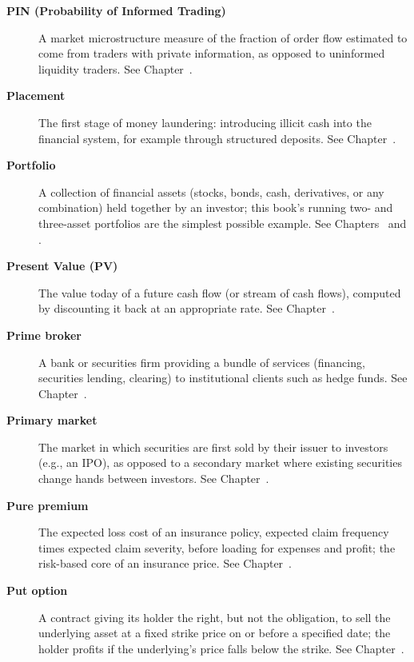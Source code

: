 \documentclass[../ai_in_finance]{subfiles}
\begin{document}
\begin{description}
\item[\textbf{PIN (Probability of Informed Trading)}] A market microstructure measure of the fraction of order flow estimated to come from traders with private information, as opposed to uninformed liquidity traders. See Chapter~.

\item[\textbf{Placement}] The first stage of money laundering: introducing illicit cash into the financial system, for example through structured deposits. See Chapter~.

\item[\textbf{Portfolio}] A collection of financial assets (stocks, bonds, cash, derivatives, or any combination) held together by an investor; this book's running two- and three-asset portfolios are the simplest possible example. See Chapters~ and .

\item[\textbf{Present Value (PV)}] The value today of a future cash flow (or stream of cash flows), computed by discounting it back at an appropriate rate. See Chapter~.

\item[\textbf{Prime broker}] A bank or securities firm providing a bundle of services (financing, securities lending, clearing) to institutional clients such as hedge funds. See Chapter~.

\item[\textbf{Primary market}] The market in which securities are first sold by their issuer to investors (e.g., an IPO), as opposed to a secondary market where existing securities change hands between investors. See Chapter~.

\item[\textbf{Pure premium}] The expected loss cost of an insurance policy, expected claim frequency times expected claim severity, before loading for expenses and profit; the risk-based core of an insurance price. See Chapter~.

\item[\textbf{Put option}] A contract giving its holder the right, but not the obligation, to sell the underlying asset at a fixed strike price on or before a specified date; the holder profits if the underlying's price falls below the strike. See Chapter~.


\end{description}
\end{document}
